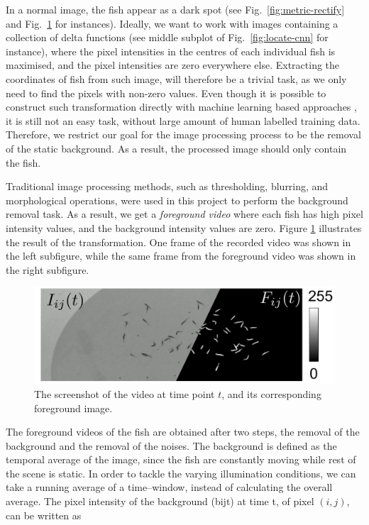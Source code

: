 \documentclass[11pt,twoside]{report}
\begin{document}
In a normal image, the fish appear as a dark spot (see Fig.~\ref{fig:metric-rectify} and Fig.~\ref{fig:2d_process} for instances).
Ideally, we want to work with images containing a collection of delta functions (see middle subplot of Fig.~\ref{fig:locate-cnn} for instance), where the pixel intensities in the centres of each individual fish is maximised, and the pixel intensities are zero everywhere else. Extracting the coordinates of fish from such image, will therefore be a trivial task, as we only need to find the pixels with non-zero values. Even though it is possible to construct such transformation directly with machine learning based approaches \cite{newby2018}, it is still not an easy task, without large amount of human labelled training data. Therefore, we restrict our goal for the image processing process to be the removal of the static background. As a result, the processed image should only contain the fish.

Traditional image processing methods, such as thresholding, blurring, and morphological operations, were used in this project to perform the background removal task.
As a result, we get a \emph{foreground video} where each fish has high pixel intensity values, and the background intensity values are zero. Figure \ref{fig:2d_process} illustrates the result of the transformation. One frame of the recorded video was shown in the left subfigure, while the same frame from the foreground video was shown in the right subfigure.


\begin{figure}
  \includegraphics[width=\linewidth]{image-process}
  \caption[Two dimensional image processing.]{
  The screenshot of the video at time point $t$, and its corresponding foreground image.
  }
  \label{fig:2d_process}
\end{figure}


The foreground videos of the fish are obtained after two  steps, the removal of the background and the removal of the noises. 
The background is defined as the temporal average of the image, since the fish are constantly moving while rest of the scene is static. In order to tackle the varying illumination conditions,
we can take a running average of a time--window, instead of calculating the overall average. The pixel intensity of the background (\gls{bijt}) at time \gls{t}, of pixel $(i, j)$, can be written as
\end{document}
